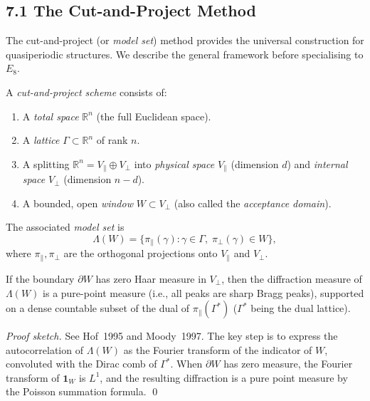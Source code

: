 \subsection{7.1 The Cut-and-Project
Method}\label{sec:cut-project-method}

The cut-and-project (or \emph{model set}) method
provides the universal construction for
quasiperiodic structures. We describe the general
framework before specialising to \(E_8\).

\begin{definition}
\label{def:cut-project}
A \emph{cut-and-project scheme} consists of:
\begin{enumerate}
  \item A \emph{total space} \(\mathbb{R}^n\)
        (the full Euclidean space).
  \item A \emph{lattice} \(\Gamma \subset \mathbb{R}^n\)
        of rank \(n\).
  \item A splitting \(\mathbb{R}^n = V_\parallel \oplus V_\perp\)
        into \emph{physical space} \(V_\parallel\)
        (dimension \(d\)) and \emph{internal space}
        \(V_\perp\) (dimension \(n-d\)).
  \item A bounded, open \emph{window}
        \(W \subset V_\perp\) (also called the
        \emph{acceptance domain}).
\end{enumerate}
The associated \emph{model set} is
\[
  \Lambda(W) = \{ \pi_\parallel(\gamma) : \gamma
    \in \Gamma,\; \pi_\perp(\gamma) \in W \},
\]
where \(\pi_\parallel, \pi_\perp\) are the
orthogonal projections onto \(V_\parallel\) and
\(V_\perp\).
\end{definition}

\begin{theorem}
\label{thm:diffraction-model-set}
If the boundary \(\partial W\) has zero Haar
measure in \(V_\perp\), then the diffraction
measure of \(\Lambda(W)\) is a pure-point measure
(i.e., all peaks are sharp Bragg peaks), supported
on a dense countable subset of the dual of
\(\pi_\parallel(\Gamma^*)\) (\(\Gamma^*\) being
the dual lattice).
\end{theorem}

\begin{proof}[Proof sketch]
See Hof~1995 and Moody~1997. The key step is to
express the autocorrelation of \(\Lambda(W)\) as
the Fourier transform of the indicator of \(W\),
convoluted with the Dirac comb of \(\Gamma^*\).
When \(\partial W\) has zero measure, the
Fourier transform of \(\mathbf{1}_W\) is
\(L^1\), and the resulting diffraction is a pure
point measure by the Poisson summation formula. \qed
\end{proof}

